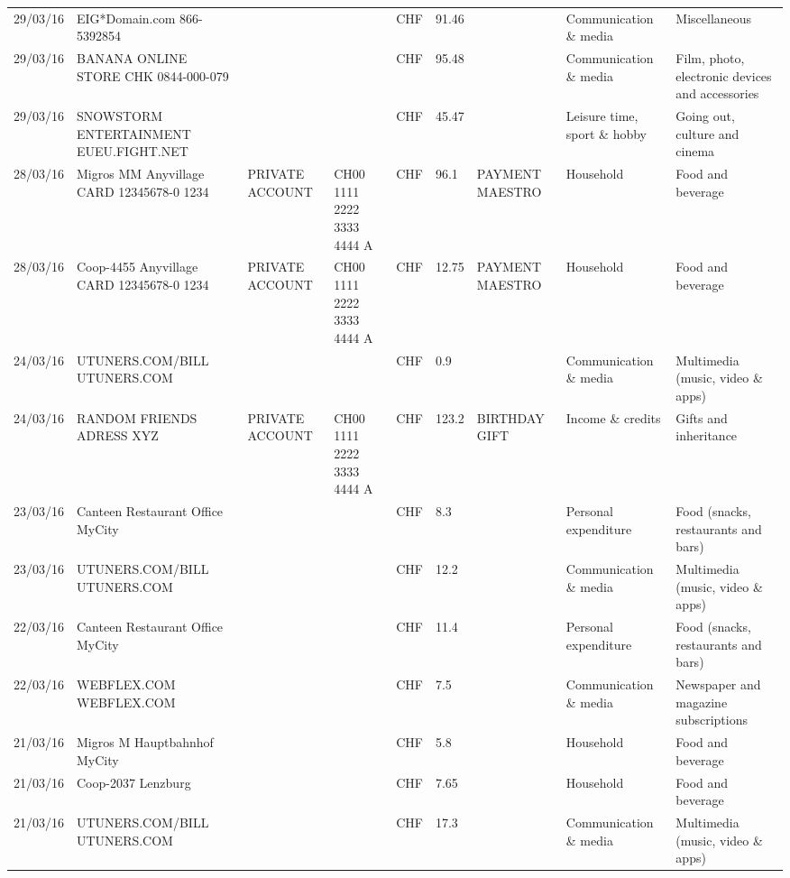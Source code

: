 \begin{landscape}
\begin{table}[t]
\begin{center}
\begin{tabular}{lllllllll}
		29/03/16 & EIG*Domain.com           866-5392854 &       &       & CHF   & 91.46 &       & Communication \& media & Miscellaneous \\
		29/03/16 & BANANA ONLINE STORE CHK   0844-000-079 &       &       & CHF   & 95.48 &       & Communication \& media & Film, photo, electronic devices and accessories \\
		29/03/16 & SNOWSTORM ENTERTAINMENT EUEU.FIGHT.NET &       &       & CHF   & 45.47 &       & Leisure time, sport \& hobby & Going out, culture and cinema \\
		28/03/16 & Migros MM Anyvillage CARD 12345678-0 1234 & PRIVATE ACCOUNT & CH00 1111 2222 3333 4444 A & CHF   & 96.1  & PAYMENT MAESTRO & Household & Food and beverage \\
		28/03/16 & Coop-4455 Anyvillage CARD 12345678-0 1234 & PRIVATE ACCOUNT & CH00 1111 2222 3333 4444 A & CHF   & 12.75 & PAYMENT MAESTRO & Household & Food and beverage \\
		24/03/16 & UTUNERS.COM/BILL          UTUNERS.COM &       &       & CHF   & 0.9   &       & Communication \& media & Multimedia (music, video \& apps) \\
		24/03/16 & RANDOM FRIENDS ADRESS XYZ & PRIVATE ACCOUNT & CH00 1111 2222 3333 4444 A & CHF   & 123.2 & BIRTHDAY GIFT & Income \& credits & Gifts and inheritance \\
		23/03/16 & Canteen Restaurant Office      MyCity &       &       & CHF   & 8.3   &       & Personal expenditure & Food (snacks, restaurants and bars) \\
		23/03/16 & UTUNERS.COM/BILL          UTUNERS.COM &       &       & CHF   & 12.2  &       & Communication \& media & Multimedia (music, video \& apps) \\
		22/03/16 & Canteen Restaurant Office      MyCity &       &       & CHF   & 11.4  &       & Personal expenditure & Food (snacks, restaurants and bars) \\
		22/03/16 & WEBFLEX.COM              WEBFLEX.COM &       &       & CHF   & 7.5   &       & Communication \& media & Newspaper and magazine subscriptions \\
		21/03/16 & Migros M Hauptbahnhof    MyCity &       &       & CHF   & 5.8   &       & Household & Food and beverage \\
		21/03/16 & Coop-2037                Lenzburg &       &       & CHF   & 7.65  &       & Household & Food and beverage \\
		21/03/16 & UTUNERS.COM/BILL          UTUNERS.COM &       &       & CHF   & 17.3  &       & Communication \& media & Multimedia (music, video \& apps) \\

\end{tabular}
\end{center}
\end{table}
\end{landscape}
